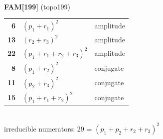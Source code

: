 \documentclass[10pt]{article}
\begin{document}
\begin{minipage}[t]{0.48\textwidth}
{}\\[2mm]\textbf{FAM[199]} (topo199)\\[2pt]{\footnotesize\begin{tabular}{@{}r@{\ \ }l@{\ \ }l@{}}\textbf{6} & $(p_1+r_1)^2$ & amplitude\\
\textbf{13} & $(r_2+r_3)^2$ & amplitude\\
\textbf{22} & $(p_1+r_1+r_2+r_3)^2$ & amplitude\\
\textbf{8} & $(p_1+r_2)^2$ & conjugate\\
\textbf{11} & $(p_2+r_3)^2$ & conjugate\\
\textbf{15} & $(p_1+r_1+r_2)^2$ & conjugate\\\end{tabular}}\\[2pt]{\scriptsize irreducible numerators: 29 = $(p_1+p_2+r_2+r_3)^2$}\end{minipage}

\bigskip
\end{document}
